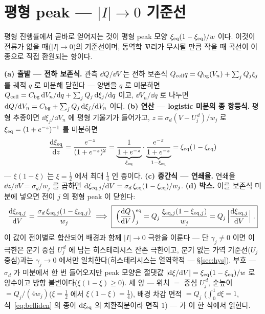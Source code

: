 \section{평형 peak --- $|I|\to0$ 기준선}\label{sec:eqpeak}
평형 진행률에서 곧바로 얻어지는 것이 평형 peak 모양 $\xi_{\mathrm{eq}}(1-\xi_{\mathrm{eq}})/w$ 이다. 이것이 전류가 없을 때($|I|\to0$)의
기준선이며, 동역학 꼬리가 무시될 만큼 작을 때 곡선이 이 종으로 직접 환원되는 항이다.

\textbf{(a) 출발 --- 전하 보존식.} 관측 $\dd Q/\dd V$ 는 전하 보존식 $Q_{\mathrm{cell}} q=Q_{\mathrm{bg}}(V_n)+\sum_jQ_j\xi_j$ 를 궤적
$q$ 로 미분해 닫힌다 --- 양변을 $q$ 로 미분하면 $Q_{\mathrm{cell}}=C_{\mathrm{bg}}\,\mathrm{d} V_n/\mathrm{d} q+\sum_jQ_j\,\mathrm{d}\xi_j/\mathrm{d} q$ 이고,
$\dd V_n/\dd q$ 로 나누면 $\mathrm{d} Q/\mathrm{d} V_n=C_{\mathrm{bg}}+\sum_jQ_j\,\mathrm{d}\xi_j/\mathrm{d} V_n$ 이다. \textbf{(b) 연산 --- logistic
미분의 종 항등식.} 평형 추종이면 $\dd\xi_j/\dd V_n$ 에 평형 기울기가 들어가고, $z\equiv\sigma_d(V-U_j^{\,d})/w_j$ 로
$\xi_{\mathrm{eq}}=(1+e^{-z})^{-1}$ 를 미분하면
\begin{equation}
\frac{\mathrm{d}\xi_{\mathrm{eq}}}{\mathrm{d} z}=\frac{e^{-z}}{(1+e^{-z})^2}
=\underbrace{\frac{1}{1+e^{-z}}}_{\xi_{\mathrm{eq}}}\cdot\underbrace{\frac{e^{-z}}{1+e^{-z}}}_{1-\xi_{\mathrm{eq}}}
=\xi_{\mathrm{eq}}(1-\xi_{\mathrm{eq}})
\label{eq:belliden}
\end{equation}
--- $\xi(1-\xi)$ 는 $\xi=\tfrac12$ 에서 최대 $\tfrac14$ 인 종이다. \textbf{(c) 중간식 --- 연쇄율.} 연쇄율
$\dd z/\dd V=\sigma_d/w_j$ 를 곱하면 $\mathrm{d}\xi_{\mathrm{eq},j}/\mathrm{d} V=\sigma_d\,\xi_{\mathrm{eq}}(1-\xi_{\mathrm{eq}})/w_j$. \textbf{(d) 박스.}
이를 보존식 미분에 넣으면 전이 $j$ 의 평형 peak 이 닫힌다:
\begin{equation}
\frac{\mathrm{d}\xi_{\mathrm{eq},j}}{\mathrm{d} V}=\frac{\sigma_d\,\xi_{\mathrm{eq},j}(1-\xi_{\mathrm{eq},j})}{w_j}
\;\Longrightarrow\;
\boxed{\;\Big(\frac{\mathrm{d} Q}{\mathrm{d} V}\Big)^{\mathrm{eq}}_j
=Q_j\,\frac{\xi_{\mathrm{eq},j}(1-\xi_{\mathrm{eq},j})}{w_j}
=Q_j\,\Big|\frac{\mathrm{d}\xi_{\mathrm{eq},j}}{\mathrm{d} V}\Big|\;.}
\label{eq:eqpeak}
\end{equation}
이 값이 전이별로 합산되어 배경과 함께 $|I|\to0$ 극한을 이룬다 --- 단 $\gamma_j\ne0$ 이면 이 극한은 분기
중심 $U_j^{\,d}$ 에 남는 히스테리시스 잔존 극한이고, 분기 없는 가역 기준선($U_j$ 중심)과는
$\gamma_j\to0$ 에서만 일치한다(히스테리시스는 열역학적 --- \S\ref{sec:hys}). 부호 --- $\sigma_d$ 가 미분에서 한 번 들어오지만 peak 모양은
절댓값 $|\mathrm{d}\xi/\mathrm{d} V|=\xi_{\mathrm{eq}}(1-\xi_{\mathrm{eq}})/w$ 로 양수이고 방향 불변이다($\xi(1-\xi)\ge0$). 세 양 --- 위치 $=$ 중심
$U_j^{\,d}$, 순높이 $=Q_j/(4w_j)$($\xi=\tfrac12$ 에서 $\xi(1-\xi)=\tfrac14$), 배경 차감 면적 $=Q_j$
($\int_0^1\dd\xi=1$, 식~\eqref{eq:belliden} 의 종이 $\mathrm{d}\xi_{\mathrm{eq}}$ 의 치환적분이라 면적 $1$) --- 가 이 한 식에서 읽힌다.

